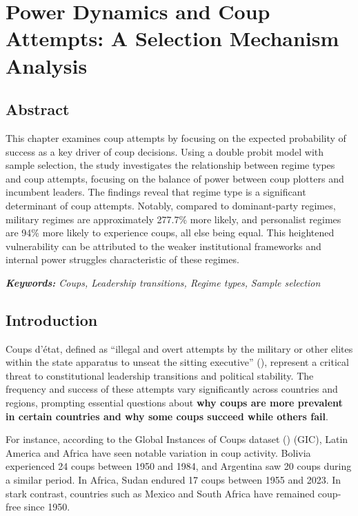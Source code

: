 \documentclass[
  12pt,
]{report}
\begin{document}
\chapter{Power Dynamics and Coup Attempts: A Selection Mechanism
Analysis}\label{sec-chapter2}

\section*{Abstract}\label{abstract-1}

This chapter examines coup attempts by focusing on the expected
probability of success as a key driver of coup decisions. Using a double
probit model with sample selection, the study investigates the
relationship between regime types and coup attempts, focusing on the
balance of power between coup plotters and incumbent leaders. The
findings reveal that regime type is a significant determinant of coup
attempts. Notably, compared to dominant-party regimes, military regimes
are approximately 277.7\% more likely, and personalist regimes are 94\%
more likely to experience coups, all else being equal. This heightened
vulnerability can be attributed to the weaker institutional frameworks
and internal power struggles characteristic of these regimes.

\emph{\textbf{Keywords:} Coups, Leadership transitions, Regime types,}
\emph{Sample selection}

\newpage

\section{Introduction}\label{introduction-1}

Coups d'état, defined as ``illegal and overt attempts by the military or
other elites within the state apparatus to unseat the sitting
executive'' (),
represent a critical threat to constitutional leadership transitions and
political stability. The frequency and success of these attempts vary
significantly across countries and regions, prompting essential
questions about \textbf{why coups are more prevalent in certain
countries and why some coups succeed while others fail}.

For instance, according to the Global Instances of Coups dataset
() (GIC), Latin America
and Africa have seen notable variation in coup activity. Bolivia
experienced 24 coups between 1950 and 1984, and Argentina saw 20 coups
during a similar period. In Africa, Sudan endured 17 coups between 1955
and 2023. In stark contrast, countries such as Mexico and South Africa
have remained coup-free since 1950.
\end{document}
